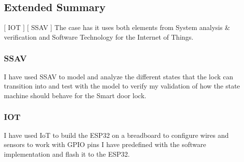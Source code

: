 \subsection*{Extended Summary}
[ IOT ] [ SSAV ] 
\newline
The case has it uses both elements from System analysis \& verification and Software Technology for the Internet of Things.
\subsubsection{\textbf{SSAV}}
I have used SSAV to model and analyze the different states that the lock can transition into and test with the model to verify my validation of how the state machine should behave for the Smart door lock.
\subsubsection{\textbf{IOT}}
I have used IoT to build the ESP32 on a breadboard to configure wires and sensors to work with GPIO pins I have predefined with the software implementation and flash it to the ESP32. 